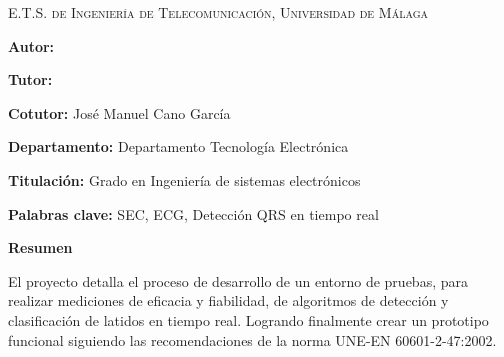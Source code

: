 
\pagestyle{fancy}
\renewcommand{\headrulewidth}{0pt}

\begin{center}
	\scshape
	E.T.S. de Ingeniería de Telecomunicación, Universidad de Málaga 
\end{center}

\bigskip

\begin{center}
	\Large \scshape
	\textbf{\tfgtitlename}
\end{center}

\bigskip \bigskip \bigskip

\begin{minipage}{\textwidth}

\textbf{Autor:} \tfgauthorname

\medskip

\textbf{Tutor:} \tfgtutorname

\medskip

\textbf{Cotutor:} José Manuel Cano García

\medskip

\textbf{Departamento:} Departamento Tecnología Electrónica

\medskip

\textbf{Titulación:} Grado en Ingeniería de sistemas electrónicos

\medskip

\textbf{Palabras clave:} SEC, ECG, Detección QRS en tiempo real

\bigskip \bigskip


\end{minipage}

\begin{center}
	\textbf{Resumen}
\end{center}

El proyecto detalla el proceso de desarrollo de un entorno de pruebas, para realizar mediciones de eficacia y fiabilidad, de algoritmos de detección y clasificación de latidos en tiempo real. Logrando finalmente crear un prototipo funcional siguiendo las recomendaciones de la norma UNE-EN 60601-2-47:2002. 

\blankpage
